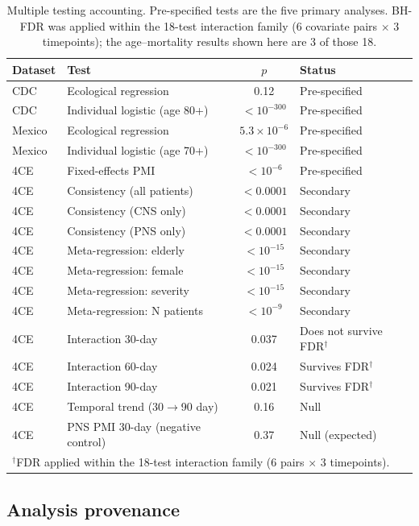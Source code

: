 \documentclass{article}
\begin{document}
\begin{table}[t]
\centering
\caption{Multiple testing accounting.  Pre-specified tests are the five
primary analyses.  BH-FDR was applied within the 18-test interaction
family (6 covariate pairs $\times$ 3 timepoints); the age--mortality
results shown here are 3 of those 18.}
\label{tab:multiplicity}
\small
\begin{tabular}{llcl}
\toprule
Dataset & Test & $p$ & Status \\
\midrule
CDC & Ecological regression & 0.12 & Pre-specified \\
CDC & Individual logistic (age 80+) & $< 10^{-300}$ & Pre-specified \\
Mexico & Ecological regression & $5.3 \times 10^{-6}$ & Pre-specified \\
Mexico & Individual logistic (age 70+) & $< 10^{-300}$ & Pre-specified \\
4CE & Fixed-effects PMI & $< 10^{-6}$ & Pre-specified \\
\midrule
4CE & Consistency (all patients) & $< 0.0001$ & Secondary \\
4CE & Consistency (CNS only) & $< 0.0001$ & Secondary \\
4CE & Consistency (PNS only) & $< 0.0001$ & Secondary \\
4CE & Meta-regression: elderly & $< 10^{-15}$ & Secondary \\
4CE & Meta-regression: female & $< 10^{-15}$ & Secondary \\
4CE & Meta-regression: severity & $< 10^{-15}$ & Secondary \\
4CE & Meta-regression: N patients & $< 10^{-9}$ & Secondary \\
4CE & Interaction 30-day & 0.037 & Does not survive FDR$^\dagger$ \\
4CE & Interaction 60-day & 0.024 & Survives FDR$^\dagger$ \\
4CE & Interaction 90-day & 0.021 & Survives FDR$^\dagger$ \\
4CE & Temporal trend (30$\to$90 day) & 0.16 & Null \\
4CE & PNS PMI 30-day (negative control) & 0.37 & Null (expected) \\
\bottomrule
\multicolumn{4}{l}{\footnotesize $^\dagger$FDR applied within the
18-test interaction family (6 pairs $\times$ 3 timepoints).}
\end{tabular}
\end{table}

\subsection{Analysis provenance}
\end{document}
